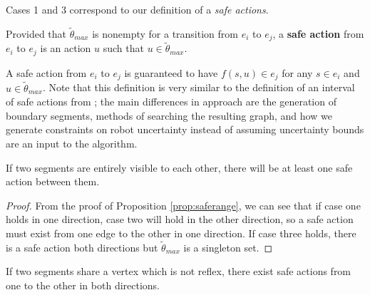 \documentclass[]{styles/svproc}  %
\begin{document}
Cases 1 and 3 correspond to our definition of a \emph{safe actions}.

\begin{definition} \label{def:sa}
Provided that $\tilde{\theta}_{max}$ is nonempty for a transition from $e_i$ to
$e_j$, a \textbf{safe action} from $e_i$ to $e_j$ is an action $u$ such
that $u \in \tilde{\theta}_{max}$.
\end{definition}

A safe action from $e_i$ to $e_j$ is guaranteed to
have $f(s,u) \in e_j$ for any $s \in e_i$ and $u \in \tilde{\theta}_{max}$.
Note that this definition is very similar to the definition of an interval of
safe actions from \cite{LewOKa13}; the main differences in approach are the
generation of boundary segments, methods of searching the resulting graph, and
how we generate constraints on robot uncertainty instead of assuming uncertainty
bounds are an input to the algorithm.

\begin{lemma}
If two segments are entirely visible to each other, there will be at least one safe
action between them.
\end{lemma}

\begin{proof}
From the proof of Proposition \ref{prop:saferange}, we can see that if case one
holds in one direction, case two will hold in the other direction, so a safe
action must exist from one edge to the other in one direction. If case three
holds, there is a safe action both directions but $\tilde{\theta}_{max}$ is a
singleton set.
\end{proof}

\begin{corollary} \label{coro:neighbor}
If two segments share a vertex which is not reflex, there exist safe actions
from one to the other in both directions.
\end{corollary}


\end{document}
